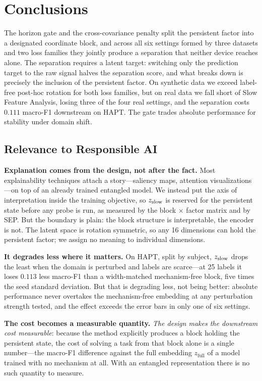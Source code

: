 \section{Conclusions}

The horizon gate and the cross-covariance penalty split the persistent factor
into a designated coordinate block, and across all six settings formed by three
datasets and two loss families they jointly produce a separation that neither
device reaches alone. The separation requires a latent target: switching only
the prediction target to the raw signal halves the separation score, and what
breaks down is precisely the inclusion of the persistent factor. On synthetic
data we exceed label-free post-hoc rotation for both loss families, but on real
data we fall short of Slow Feature Analysis, losing three of the four real
settings, and the separation costs $0.111$ macro-F1 downstream on HAPT. The
gate trades absolute performance for stability under domain shift.

\subsection{Relevance to Responsible AI}

\textbf{Explanation comes from the design, not after the fact.} Most
explainability techniques attach a story---saliency maps, attention
visualizations---on top of an already trained entangled model. We instead put
the axis of interpretation inside the training objective, so $z_{\mathrm{slow}}$ is
reserved for the persistent state before any probe is run, as measured by the
block $\times$ factor matrix and by SEP. But the boundary is plain:
the block structure is interpretable, the encoder is not. The latent space is
rotation symmetric, so any 16 dimensions can hold the persistent factor; we
assign no meaning to individual dimensions.

\textbf{It degrades less where it matters.} On HAPT, split by subject,
$z_{\mathrm{slow}}$ drops the least when the domain is perturbed and labels are
scarce---at 25 labels it loses $0.113$ less macro-F1 than a width-matched
mechanism-free block, five times the seed standard deviation. But that is
degrading less, not being better: absolute performance never overtakes the
mechanism-free embedding at any perturbation strength tested, and the effect
exceeds the error bars in only one of six settings.

\textbf{The cost becomes a measurable quantity.} \emph{The design makes the
downstream cost measurable}: because the method explicitly produces a block
holding the persistent state, the cost of solving a task from that block alone
is a single number---the macro-F1 difference against the full embedding
$z_{\mathrm{full}}$ of a model trained with no mechanism at all. With an
entangled representation there is no such quantity to measure.

